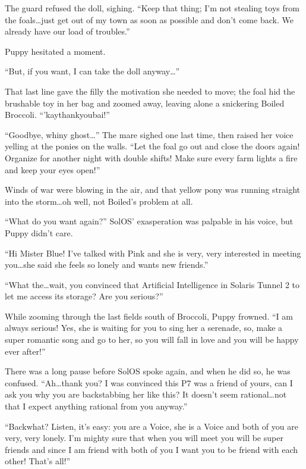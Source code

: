 The guard refused the doll, sighing. ``Keep that thing; I'm not stealing toys from the foals\dots just get out of my town as soon as possible and don't come back. We already have our load of troubles.''

Puppy hesitated a moment.

``But, if you want, I can take the doll anyway\dots''

That last line gave the filly the motivation she needed to move; the foal hid the brushable toy in her bag and zoomed away, leaving alone a snickering Boiled Broccoli. ``'kaythankyoubai!''

``Goodbye, whiny ghost\dots'' The mare sighed one last time, then raised her voice yelling at the ponies on the walls. ``Let the foal go out and close the doors again! Organize for another night with double shifts! Make sure every farm lights a fire and keep your eyes open!''

Winds of war were blowing in the air, and that yellow pony was running straight into the storm\dots oh well, not Boiled's problem at all.

\horizonline


``What do you want again?'' SolOS' exasperation was palpable in his voice, but Puppy didn't care.

``Hi Mister Blue! I've talked with Pink and she is very, very interested in meeting you\dots she said she feels so lonely and wants new friends.''

``What the\dots wait, you convinced that Artificial Intelligence in Solaris Tunnel 2 to let me access its storage? Are you serious?''

While zooming through the last fields south of Broccoli, Puppy frowned. ``I am always serious! Yes, she is waiting for you to sing her a serenade, so, make a super romantic song and go to her, so you will fall in love and you will be happy ever after!''

There was a long pause before SolOS spoke again, and when he did so, he was confused. ``Ah\dots thank you? I was convinced this P7 was a friend of yours, can I ask you why you are backstabbing her like this? It doesn't seem rational\dots not that I expect anything rational from you anyway.''

``Backwhat? Listen, it's easy: you are a Voice, she is a Voice and both of you are very, very lonely. I'm mighty sure that when you will meet you will be super friends and since I am friend with both of you I want you to be friend with each other! That's all!''

